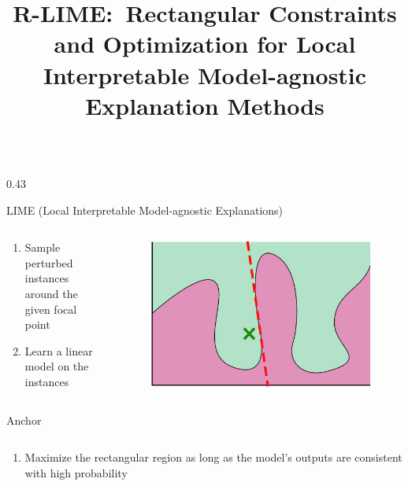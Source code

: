 \documentclass[unicode]{beamer}
\title{
  R-LIME:\ Rectangular Constraints and Optimization for
  Local Interpretable Model-agnostic Explanation Methods
}
\begin{document}
\begin{frame}
	\begin{columns}[t]
		\def\lcol{0.43}
		\def\rcol{0.53}
		\begin{column}{\lcol\linewidth}
			\begin{block}{LIME \Large(Local Interpretable Model-agnostic Explanations)}
				\begin{columns}
					\begin{column}{.65\textwidth}
						{
							\renewcommand{\leftmargini}{2.5em}
							\begin{enumerate}
								\item Sample perturbed instances around the given focal point
								\item Learn a linear model on the instances
							\end{enumerate}
						}
					\end{column}
					\begin{column}{.35\textwidth}
						\begin{figure}
							\centering
							\includegraphics[width=.8\textwidth]{src/img/visual-lime}
						\end{figure}
					\end{column}
				\end{columns}
			\end{block}
			\begin{block}{Anchor}
				\begin{columns}
					\begin{column}{.65\textwidth}
						{
							\renewcommand{\leftmargini}{2.5em}
							\begin{enumerate}
								\item Maximize the rectangular region as long as
								      the model’s outputs are consistent with high probability
							\end{enumerate}
}
\end{column}
\end{columns}
\end{block}
\end{column}
\end{columns}
\end{frame}
\end{document}
